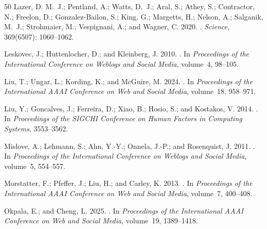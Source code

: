 \begin{thebibliography}{50}
Lazer, D. M.~J.; Pentland, A.; Watts, D.~J.; Aral, S.; Athey, S.; Contractor, N.; Freelon, D.; Gonzalez-Bailon, S.; King, G.; Margetts, H.; Nelson, A.; Salganik, M.~J.; Strohmaier, M.; Vespignani, A.; and Wagner, C. 2020.
.
\newblock \emph{Science}, 369(6507): 1060--1062.

Leskovec, J.; Huttenlocher, D.; and Kleinberg, J. 2010.
.
\newblock In \emph{Proceedings of the International Conference on Weblogs and Social Media}, volume~4, 98--105.

Liu, T.; Ungar, L.; Kording, K.; and McGuire, M. 2024.
.
\newblock In \emph{Proceedings of the International AAAI Conference on Web and Social Media}, volume~18, 958--971.

Liu, Y.; Goncalves, J.; Ferreira, D.; Xiao, B.; Hosio, S.; and Kostakos, V. 2014.
.
\newblock In \emph{Proceedings of the SIGCHI Conference on Human Factors in Computing Systems}, 3553--3562.

Mislove, A.; Lehmann, S.; Ahn, Y.-Y.; Onnela, J.-P.; and Rosenquist, J. 2011.
.
\newblock In \emph{Proceedings of the International Conference on Weblogs and Social Media}, volume~5, 554--557.

Morstatter, F.; Pfeffer, J.; Liu, H.; and Carley, K. 2013.
.
\newblock In \emph{Proceedings of the International AAAI Conference on Web and Social Media}, volume~7, 400--408.

Okpala, E.; and Cheng, L. 2025.
.
\newblock In \emph{Proceedings of the International AAAI Conference on Web and Social Media}, volume~19, 1389--1418.


\end{thebibliography}
